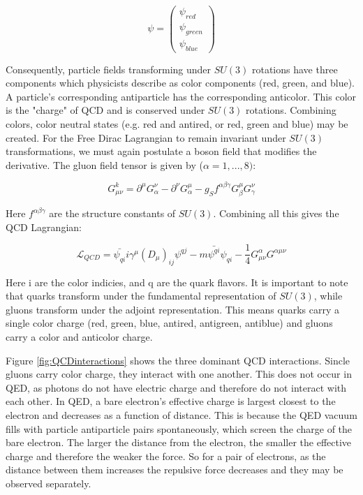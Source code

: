 \begin{equation}
\psi = \begin{pmatrix} \psi_{red} \\ \psi_{green} \\ \psi_{blue}\end{pmatrix}
\end{equation}

Consequently, particle fields transforming under $SU(3)$ rotations have three components which physicists describe as color components (red, green, and blue). A particle's corresponding antiparticle has the corresponding anticolor. This color is the "charge" of QCD and is conserved under $SU(3)$ rotations. Combining colors, color neutral states (e.g. red and antired, or red, green and blue) may be created.
For the Free Dirac Lagrangian to remain invariant under $SU(3)$ transformations, we must again postulate a boson field that modifies the derivative. The gluon field tensor is given by ($\alpha=1,...,8)$:

\begin{equation}
G_{\mu\nu}^{k}  = \partial^{\mu}G^{\nu}_{\alpha}-\partial^{\nu}G^{\mu}_{\alpha}-g_{S}f^{\alpha\beta\gamma}G^{\mu}_{\beta}G^{\nu}_{\gamma}
\end{equation}

Here $f^{\alpha\beta\gamma}$ are the structure constants of $SU(3)$. Combining all this gives the QCD Lagrangian:

\begin{equation}
\mathcal{L}_{QCD} = \bar{\psi_{qi}}i\gamma^{\mu} (D_{\mu})_{ij}\psi^{qj} - m\bar{\psi^{qi}}\psi_{qi} - \frac{1}{4}G^{\alpha}_{\mu\nu}G^{\alpha\mu\nu} 
\end{equation}

Here i are the color indicies, and q are the quark flavors. It is important to note that quarks transform under the fundamental representation of $SU(3)$, while gluons transform under the adjoint representation. This means quarks carry a single color charge (red, green, blue, antired, antigreen, antiblue) and gluons carry a color and anticolor charge. 

Figure \ref{fig:QCDinteractions} shows the three dominant QCD interactions. Sincle gluons carry color charge, they interact with one another. This does not occur in QED, as photons do not have electric charge and therefore do not interact with each other. In QED, a bare electron's effective charge is largest closest to the electron and decreases as a function of distance. This is because the QED vacuum fills with particle antiparticle pairs spontaneously, which screen the charge of the bare electron. The larger the distance from the electron, the smaller the effective charge and therefore the weaker the force. So for a pair of electrons, as the distance between them increases the repulsive force decreases and they may be observed separately.

